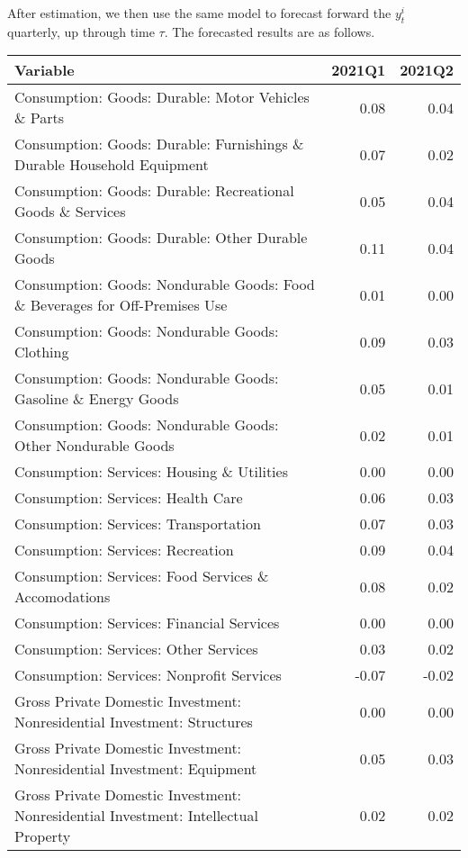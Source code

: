 \documentclass[11pt, letterpaper]{article}\usepackage[]{graphicx}\usepackage[]{color}
\begin{document}
After estimation, we then use the same model to forecast forward the $y^i_t$ quarterly, up through time $\tau$. 
The forecasted results are as follows.
\begin{table}[H]
\centering
\begingroup\scriptsize
\begin{tabular}{lrr}
  \hline
Variable & 2021Q1 & 2021Q2 \\ 
  \hline
Consumption: Goods: Durable: Motor Vehicles \& Parts & 0.08 & 0.04 \\ 
  Consumption: Goods: Durable: Furnishings \& Durable Household Equipment & 0.07 & 0.02 \\ 
  Consumption: Goods: Durable: Recreational Goods \& Services & 0.05 & 0.04 \\ 
  Consumption: Goods: Durable: Other Durable Goods & 0.11 & 0.04 \\ 
  Consumption: Goods: Nondurable Goods: Food \& Beverages for Off-Premises Use & 0.01 & 0.00 \\ 
  Consumption: Goods: Nondurable Goods: Clothing & 0.09 & 0.03 \\ 
  Consumption: Goods: Nondurable Goods: Gasoline \& Energy Goods & 0.05 & 0.01 \\ 
  Consumption: Goods: Nondurable Goods: Other Nondurable Goods & 0.02 & 0.01 \\ 
  Consumption: Services: Housing \& Utilities & 0.00 & 0.00 \\ 
  Consumption: Services: Health Care & 0.06 & 0.03 \\ 
  Consumption: Services: Transportation & 0.07 & 0.03 \\ 
  Consumption: Services: Recreation & 0.09 & 0.04 \\ 
  Consumption: Services: Food Services \& Accomodations & 0.08 & 0.02 \\ 
  Consumption: Services: Financial Services & 0.00 & 0.00 \\ 
  Consumption: Services: Other Services & 0.03 & 0.02 \\ 
  Consumption: Services: Nonprofit Services & -0.07 & -0.02 \\ 
  Gross Private Domestic Investment: Nonresidential Investment: Structures & 0.00 & 0.00 \\ 
  Gross Private Domestic Investment: Nonresidential Investment: Equipment & 0.05 & 0.03 \\ 
  Gross Private Domestic Investment: Nonresidential Investment: Intellectual Property & 0.02 & 0.02 \\ 

\end{tabular}
\end{table}
\end{document}
